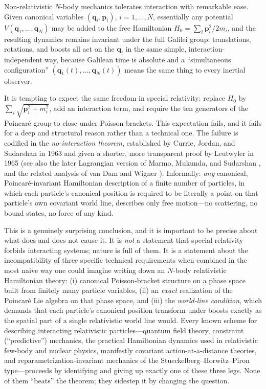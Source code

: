 \documentclass[11pt]{article}
\newcommand{\bq}{\mathbf{q}}
\newcommand{\bp}{\mathbf{p}}
\begin{document}
Non-relativistic $N$-body mechanics tolerates interaction with remarkable ease. Given canonical variables $(\bq_i,\bp_i)$, $i=1,\dots,N$, essentially any potential $V(\bq_1,\dots,\bq_N)$ may be added to the free Hamiltonian $H_0=\sum_i \bp_i^2/2m_i$, and the resulting dynamics remains invariant under the full Galilei group: translations, rotations, and boosts all act on the $\bq_i$ in the same simple, interaction-independent way, because Galilean time is absolute and a ``simultaneous configuration'' $(\bq_1(t),\dots,\bq_N(t))$ means the same thing to every inertial observer.

It is tempting to expect the same freedom in special relativity: replace $H_0$ by $\sum_i\sqrt{\bp_i^2+m_i^2}$, add an interaction term, and require the ten generators of the Poincar\'e group to close under Poisson brackets. This expectation fails, and it fails for a deep and structural reason rather than a technical one. The failure is codified in the \emph{no-interaction theorem}, established by Currie, Jordan, and Sudarshan in 1963 \cite{CJS1963,Currie1963} and given a shorter, more transparent proof by Leutwyler in 1965 \cite{Leutwyler1965} (see also the later Lagrangian version of Marmo, Mukunda, and Sudarshan \cite{MMS1984}, and the related analysis of van Dam and Wigner \cite{vanDamWigner1965}). Informally: \emph{any} canonical, Poincar\'e-invariant Hamiltonian description of a finite number of particles, in which each particle's canonical position is required to be literally a point on that particle's own covariant world line, describes only free motion---no scattering, no bound states, no force of any kind.

This is a genuinely surprising conclusion, and it is important to be precise about what does and does not cause it. It is \emph{not} a statement that special relativity forbids interacting systems; nature is full of them. It is a statement about the incompatibility of three specific technical requirements when combined in the most naive way one could imagine writing down an $N$-body relativistic Hamiltonian theory: (i) canonical Poisson-bracket structure on a phase space built from finitely many particle variables, (ii) an \emph{exact} realization of the Poincar\'e Lie algebra on that phase space, and (iii) the \emph{world-line condition}, which demands that each particle's canonical position transform under boosts exactly as the spatial part of a single relativistic world line would. Every known scheme for describing interacting relativistic particles---quantum field theory, constraint (``predictive'') mechanics, the practical Hamiltonian dynamics used in relativistic few-body and nuclear physics, manifestly covariant action-at-a-distance theories, and reparametrization-invariant mechanics of the Stueckelberg--Horwitz--Piron type---proceeds by identifying and giving up exactly one of these three legs. None of them ``beats'' the theorem; they sidestep it by changing the question.
\end{document}
